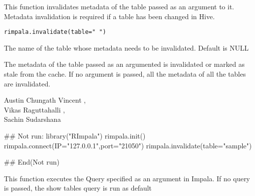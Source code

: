 \documentclass[letterpaper]{book}
\begin{document}
%
\begin{Description}\relax
This function invalidates metadata of the table passed as an argument to it. Metadata invalidation is required if a table has been changed in Hive.
\end{Description}
%
\begin{Usage}
\begin{verbatim}
rimpala.invalidate(table=" ")
\end{verbatim}
\end{Usage}
%
\begin{Arguments}
\begin{ldescription}
\item[\code{table}] 
The name of the table whose metadata needs to be invalidated. Default is NULL

\end{ldescription}
\end{Arguments}
%
\begin{Value}
The metadata of the table passed as an argumented is invalidated or marked as stale from the cache. If no argument is passed, all the metadata of all the tables are invalidated.
\end{Value}
%
\begin{Author}\relax
Austin Chungath Vincent ,\\{}
Vikas Raguttahalli ,\\{}
Sachin Sudarshana 
\end{Author}
%
\begin{Examples}
\begin{ExampleCode}
## Not run: 
library("RImpala")
rimpala.init()
rimpala.connect(IP="127.0.0.1",port="21050")
rimpala.invalidate(table="sample")

## End(Not run)
\end{ExampleCode}
\end{Examples}
%
\begin{Description}\relax
This function executes the Query specified as an argument in Impala. If no query is passed, the show tables query is run as default
\end{Description}
\end{document}
